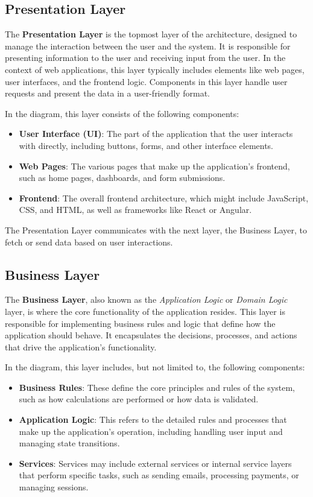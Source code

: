 \subsection{Presentation Layer}

The \textbf{Presentation Layer} is the topmost layer of the architecture, designed to manage the interaction between the user and the system. It is responsible for presenting information to the user and receiving input from the user. In the context of web applications, this layer typically includes elements like web pages, user interfaces, and the frontend logic. Components in this layer handle user requests and present the data in a user-friendly format.

In the diagram, this layer consists of the following components:
\begin{itemize}
	\item \textbf{User Interface (UI)}: The part of the application that the user interacts with directly, including buttons, forms, and other interface elements.
	\item \textbf{Web Pages}: The various pages that make up the application’s frontend, such as home pages, dashboards, and form submissions.
	\item \textbf{Frontend}: The overall frontend architecture, which might include JavaScript, CSS, and HTML, as well as frameworks like React or Angular.
\end{itemize}

The Presentation Layer communicates with the next layer, the Business Layer, to fetch or send data based on user interactions.

\subsection{Business Layer}

The \textbf{Business Layer}, also known as the \textit{Application Logic} or \textit{Domain Logic} layer, is where the core functionality of the application resides. This layer is responsible for implementing business rules and logic that define how the application should behave. It encapsulates the decisions, processes, and actions that drive the application’s functionality. 

In the diagram, this layer includes, but not limited to, the following components:
\begin{itemize}
	\item \textbf{Business Rules}: These define the core principles and rules of the system, such as how calculations are performed or how data is validated.
	\item \textbf{Application Logic}: This refers to the detailed rules and processes that make up the application’s operation, including handling user input and managing state transitions.
	\item \textbf{Services}: Services may include external services or internal service layers that perform specific tasks, such as sending emails, processing payments, or managing sessions.
\end{itemize}


